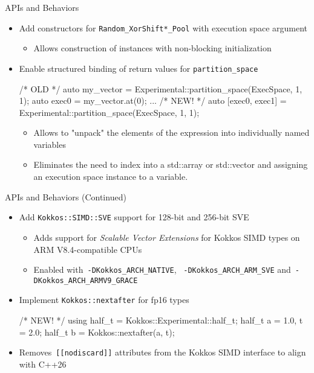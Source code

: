 \begin{frame}[fragile]{APIs and Behaviors}
 \begin{itemize}
  \item Add constructors for \texttt{Random\_XorShift*\_Pool} with execution space argument
      \begin{itemize}
      \item Allows construction of instances with non-blocking initialization
    \end{itemize}
   \item Enable structured binding of return values for \texttt{partition\_space}
        \begin{code}[keywords={std}]
          /* OLD */
          auto my_vector = 
                  Experimental::partition_space(ExecSpace, 1, 1);
          auto exec0 = my_vector.at(0);
          ...
          /* NEW! */
          auto [exec0, exec1] = 
                  Experimental::partition_space(ExecSpace, 1, 1);
        \end{code}
    \begin{itemize}
      \item Allows to "unpack" the elements of the expression into individually named variables
      \item Eliminates the need to index into a std::array or std::vector and assigning an execution space instance to a variable.
      \end{itemize}
 \end{itemize}
\end{frame}


\begin{frame}[fragile]{APIs and Behaviors (Continued)}
 \begin{itemize}
     \item Add \texttt{Kokkos::SIMD::SVE} support for 128-bit and 256-bit SVE 
     \begin{itemize}
      \item Adds support for \emph{Scalable Vector Extensions} for Kokkos SIMD types on ARM V8.4-compatible CPUs
      \item Enabled with~\texttt{-DKokkos\_ARCH\_NATIVE}, ~\texttt{-DKokkos\_ARCH\_ARM\_SVE} and~\texttt{-DKokkos\_ARCH\_ARMV9\_GRACE}
     \end{itemize}
     \item Implement \texttt{Kokkos::nextafter} for fp16 types
        \begin{code}[keywords={std}]
          /* NEW! */
          using half_t = Kokkos::Experimental::half_t;
          half_t a = 1.0, t = 2.0;
          half_t b = Kokkos::nextafter(a, t);
        \end{code}
        \item Removes~\texttt{[[nodiscard]]} attributes from the Kokkos SIMD interface to align with C++26
 \end{itemize}
\end{frame}

